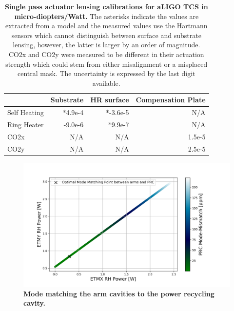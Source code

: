 	\begin{table}[]
		\centering
		\begin{tabular}{|l||r|r|r|}
			\hline
			\hline
			& \multicolumn{1}{c|}{Substrate} & \multicolumn{1}{c|}{HR surface} & \multicolumn{1}{c|}{Compensation Plate} \\ \hline
			Self Heating & *4.9e-4                       & *-3.6e-5                        & N/A                                     \\ \hline
			Ring Heater  & -9.0e-6                       & *9.9e-7                         & N/A                                     \\ \hline
			CO2x         & N/A                            & N/A                             & 1.5e-5                                  \\ \hline
			CO2y         & N/A                            & N/A                             & 2.5e-5                                  \\ \hline
		\end{tabular}
		\caption[Single pass actuator lensing calibrations for aLIGO TCS in micro-diopters/Watt.] 
		{\textbf{Single pass actuator lensing calibrations for aLIGO TCS in micro-diopters/Watt.} The asterisks indicate the values are extracted from a model and the measured values use the Hartmann sensors which cannot distinguish between surface and substrate lensing, however, the latter is larger by an order of magnitude.  CO2x and CO2y were measured to be different in their actuation strength which could stem from either misalignment or a misplaced central mask.  The uncertainty is expressed by the last digit available.
		}
		\label{tbl:Actuaor_calibs}
	\end{table}
	
	\begin{figure}[!]
		\centering
		\includegraphics[width=1.0 \textwidth]{../Figures/ETM_TCS_Settings.png}
		\caption[Mode matching the arm cavities to the power recycling cavity.]{
			\textbf{Mode matching the arm cavities to the power recycling cavity.}
		}
		\label{fig:TCS_ETM}
	\end{figure}
\clearpage
